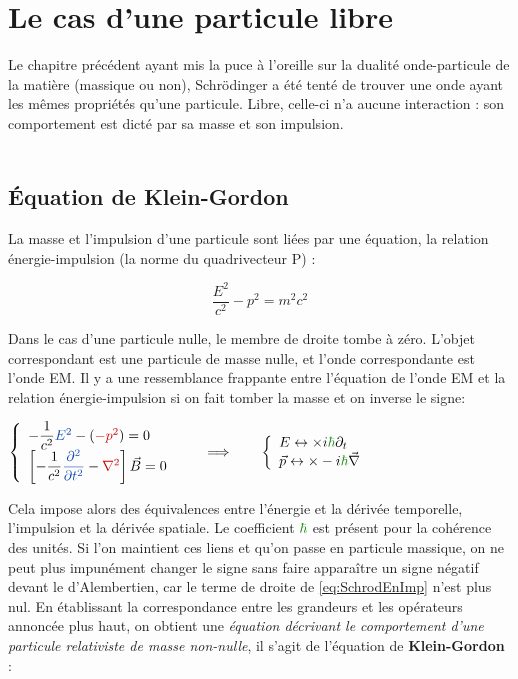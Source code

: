 \documentclass[11pt]{book}
\begin{document}
\section{Le cas d'une particule libre}
Le chapitre précédent ayant mis la puce à l'oreille sur la dualité onde-particule de la matière (massique ou non), Schrödinger a été tenté de trouver une onde ayant les mêmes propriétés qu'une particule. Libre, celle-ci n'a aucune interaction : son comportement est dicté par sa masse et son impulsion. \\ \\
\subsection{Équation de Klein-Gordon}
La masse et l'impulsion d'une particule sont liées par une équation, la relation énergie-impulsion (la norme du quadrivecteur $\mathrm{P}$) :
\begin{large}
\begin{equation}\label{eq:SchrodEnImp}
\dfrac{E^2}{c^2} - p^2 = m^2c^2
\end{equation}
\end{large}
Dans le cas d'une particule nulle, le membre de droite tombe à zéro. L'objet correspondant est une particule de masse nulle, et l'onde correspondante est l'onde EM. Il y a une ressemblance frappante entre l'équation de l'onde EM et la relation énergie-impulsion si on fait tomber la masse et on inverse le signe: 
\begin{center}
$\left\{\begin{array}{l}
-\dfrac{1}{c^2} \bleu{E^2} - (\rouge{- p^2}) = 0 \\
\left[-\dfrac{1}{c^2} \bleu{\dfrac{\partial^2}{\partial t^2}} - \rouge{\nabla^2}\right] \vec{B} = 0
\end{array}\right. \qquad \Longrightarrow \qquad \left\{\begin{array}{l}
E \leftrightarrow \times i\green{\hbar}\partial_t \\
\vec{p} \leftrightarrow \times -i\green{\hbar}\vec{\nabla}
\end{array}\right.$
\end{center}
Cela impose alors des équivalences entre l'énergie et la dérivée temporelle, l'impulsion et la dérivée spatiale. Le coefficient $\green{\hbar}$ est présent pour la cohérence des unités. Si l'on maintient ces liens et qu'on passe en particule massique, on ne peut plus impunément changer le signe sans faire apparaître un signe négatif devant le d'Alembertien, car le terme de droite de \ref{eq:SchrodEnImp} n'est plus nul. En établissant la correspondance entre les grandeurs et les opérateurs annoncée plus haut, on obtient une \textit{équation décrivant le comportement d'une particule relativiste de masse non-nulle}, il s'agit de l'équation de \textbf{Klein-Gordon} :
\end{document}
